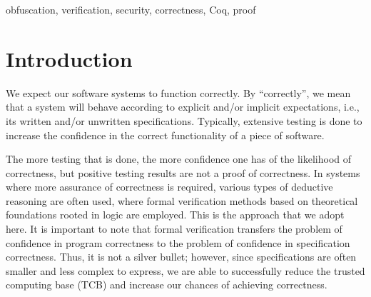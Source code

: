 \documentclass[compsoc,conference,a4paper,10pt,times]{IEEEtran}
\begin{document}
\begin{IEEEkeywords}
obfuscation, verification, security, correctness, Coq, proof
\end{IEEEkeywords}

\section{Introduction}
We expect our software systems to function correctly. By ``correctly'', we mean that a system will behave according to explicit and/or implicit expectations, i.e., its written and/or unwritten specifications. Typically, extensive testing is done to increase the confidence in the correct functionality of a piece of software.

\par The more testing that is done, the more confidence one has of the likelihood of correctness, but positive testing results are not a proof of correctness.
In systems where more assurance of correctness is required, various types of deductive reasoning are often used, where formal verification methods based on theoretical foundations rooted in logic are employed. This is the approach that we adopt here.  It is important to note that formal verification transfers the problem of confidence in program correctness to the problem of confidence in specification correctness.  Thus, it is not a silver bullet; however, since specifications are often smaller and less complex to express, we are able to successfully reduce the trusted computing base (TCB) and increase our chances of achieving correctness.
\end{document}

